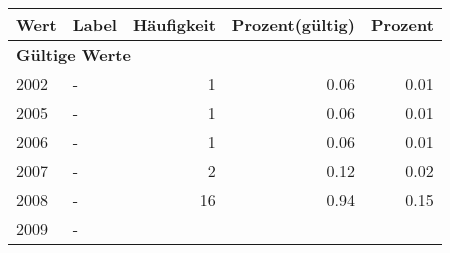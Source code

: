     \begin{longtable}{lXrrr}
     \toprule
     \textbf{Wert} & \textbf{Label} & \textbf{Häufigkeit} & \textbf{Prozent(gültig)} & \textbf{Prozent} \\
     \endhead
     \midrule
     \multicolumn{5}{l}{\textbf{Gültige Werte}}\\

     2002 &
     \multicolumn{1}{X}{ -  } &


       \num{1} &
       \num[round-mode=places,round-precision=2]{0.06} &
         \num[round-mode=places,round-precision=2]{0.01} \\

     2005 &
     \multicolumn{1}{X}{ -  } &


       \num{1} &
       \num[round-mode=places,round-precision=2]{0.06} &
         \num[round-mode=places,round-precision=2]{0.01} \\

     2006 &
     \multicolumn{1}{X}{ -  } &


       \num{1} &
       \num[round-mode=places,round-precision=2]{0.06} &
         \num[round-mode=places,round-precision=2]{0.01} \\

     2007 &
     \multicolumn{1}{X}{ -  } &


       \num{2} &
       \num[round-mode=places,round-precision=2]{0.12} &
         \num[round-mode=places,round-precision=2]{0.02} \\

     2008 &
     \multicolumn{1}{X}{ -  } &


       \num{16} &
       \num[round-mode=places,round-precision=2]{0.94} &
         \num[round-mode=places,round-precision=2]{0.15} \\

     2009 &
     \multicolumn{1}{X}{ -  } &



\end{longtable}
